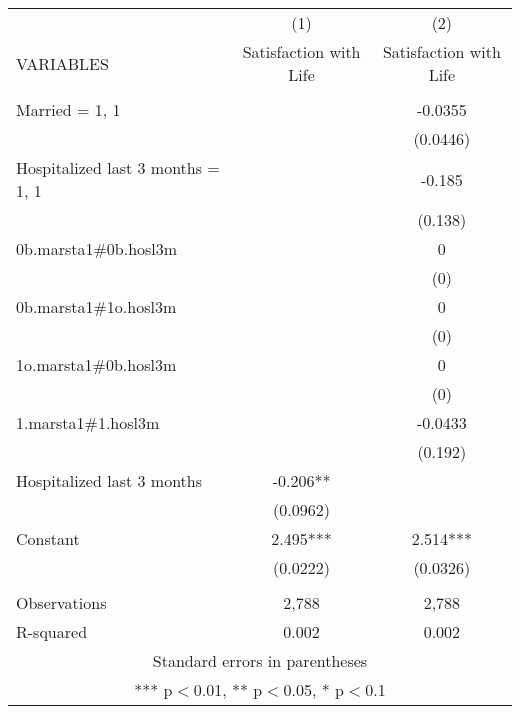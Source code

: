 \begin{tabular}{lcc} \hline
 & (1) & (2) \\
VARIABLES & Satisfaction with Life & Satisfaction with Life \\ \hline
 &  &  \\
Married = 1, 1 &  & -0.0355 \\
 &  & (0.0446) \\
Hospitalized last 3 months = 1, 1 &  & -0.185 \\
 &  & (0.138) \\
0b.marsta1\#0b.hosl3m &  & 0 \\
 &  & (0) \\
0b.marsta1\#1o.hosl3m &  & 0 \\
 &  & (0) \\
1o.marsta1\#0b.hosl3m &  & 0 \\
 &  & (0) \\
1.marsta1\#1.hosl3m &  & -0.0433 \\
 &  & (0.192) \\
Hospitalized last 3 months & -0.206** &  \\
 & (0.0962) &  \\
Constant & 2.495*** & 2.514*** \\
 & (0.0222) & (0.0326) \\
 &  &  \\
Observations & 2,788 & 2,788 \\
 R-squared & 0.002 & 0.002 \\ \hline
\multicolumn{3}{c}{ Standard errors in parentheses} \\
\multicolumn{3}{c}{ *** p$<$0.01, ** p$<$0.05, * p$<$0.1} \\
\end{tabular}
